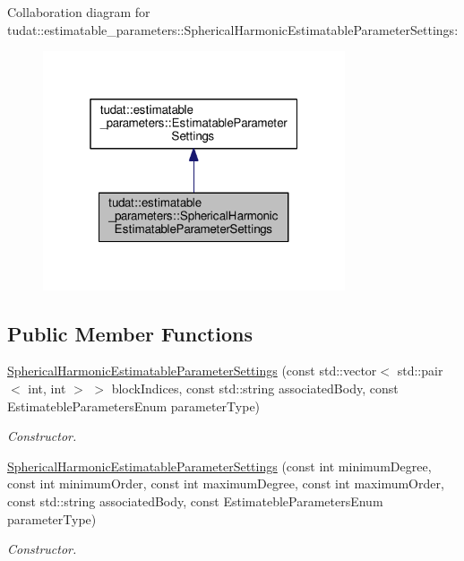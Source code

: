 Collaboration diagram for tudat\+:\+:estimatable\+\_\+parameters\+:\+:Spherical\+Harmonic\+Estimatable\+Parameter\+Settings\+:
\nopagebreak
\begin{figure}[H]
\begin{center}
\leavevmode
\includegraphics[width=253pt]{classtudat_1_1estimatable__parameters_1_1SphericalHarmonicEstimatableParameterSettings__coll__graph}
\end{center}
\end{figure}
\subsection*{Public Member Functions}
\begin{DoxyCompactItemize}
\item 
\hyperlink{classtudat_1_1estimatable__parameters_1_1SphericalHarmonicEstimatableParameterSettings_ab0db3cb2bdaf63069809a92c5ed4a96d}{Spherical\+Harmonic\+Estimatable\+Parameter\+Settings} (const std\+::vector$<$ std\+::pair$<$ int, int $>$ $>$ block\+Indices, const std\+::string associated\+Body, const Estimateble\+Parameters\+Enum parameter\+Type)
\begin{DoxyCompactList}\small\item\em Constructor. \end{DoxyCompactList}\item 
\hyperlink{classtudat_1_1estimatable__parameters_1_1SphericalHarmonicEstimatableParameterSettings_a14ec400165304458e051bc75748494df}{Spherical\+Harmonic\+Estimatable\+Parameter\+Settings} (const int minimum\+Degree, const int minimum\+Order, const int maximum\+Degree, const int maximum\+Order, const std\+::string associated\+Body, const Estimateble\+Parameters\+Enum parameter\+Type)
\begin{DoxyCompactList}\small\item\em Constructor. \end{DoxyCompactList}\end{DoxyCompactItemize}
